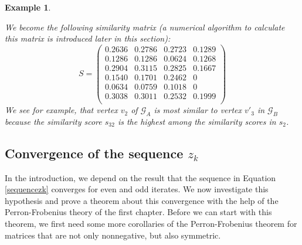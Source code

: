 \documentclass[a4paper,11pt]{report}
\newtheorem{example}[theorem]{Example}
\newcommand{\graf}{\mathscr{G}}
\begin{document}
\begin{example}
\begin{center}
\end{center}
We become the following similarity matrix (a numerical algorithm to calculate this matrix is introduced later
in this section):
$$S = \begin{pmatrix}
0.2636 & 0.2786 & 0.2723 & 0.1289 \\
0.1286 & 0.1286 & 0.0624 & 0.1268 \\
0.2904 & 0.3115 & 0.2825 & 0.1667 \\
0.1540 & 0.1701 & 0.2462 & 0 \\
0.0634 & 0.0759 & 0.1018 & 0 \\
0.3038 & 0.3011 & 0.2532 & 0.1999\\
 \end{pmatrix}$$
 We see for example, that vertex $v_2$ of $\graf_A$ is most similar to
 vertex $v'_3$ in $\graf_B$  because the similarity score $s_{32}$ 
 is the highest among the similarity scores in $s_{2}$.
 \end{example}
 
 \subsection{Convergence of the sequence $z_k$}
In the introduction, we depend on the result that the sequence in Equation \ref{sequencezk} 
converges for even and odd iterates. We now investigate this hypothesis and 
prove a theorem about this convergence with the help of the Perron-Frobenius theory of the 
first chapter. Before we can start with this theorem, we first need some more 
corollaries of the Perron-Frobenius theorem for matrices that are not only nonnegative, but also symmetric.
\end{document}
